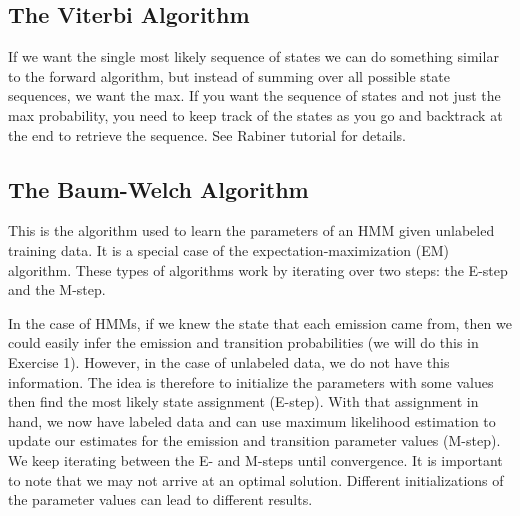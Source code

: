 \documentclass[11pt, oneside]{article}
\begin{document}
\subsection{The Viterbi Algorithm}

If we want the single most likely sequence of states we can do something similar to the forward algorithm, but instead of summing over all possible state sequences, we want the max. If you want the sequence of states and not just the max probability, you need to keep track of the states as you go and backtrack at the end to retrieve the sequence. See Rabiner tutorial for details.


\subsection{The Baum-Welch Algorithm}

This is the algorithm used to learn the parameters of an HMM given unlabeled training data. 
It is a special case of the expectation-maximization (EM) algorithm. These types of algorithms work by iterating over two steps: the E-step and the M-step.

In the case of HMMs, if we knew the state that each emission came from, then we could easily infer the emission and transition probabilities (we will do this in Exercise 1). However, in the case of unlabeled data, we do not have this information. The idea is therefore to initialize the parameters with some values then find the most likely state assignment (E-step). With that assignment in hand, we now have labeled data and can use maximum likelihood estimation to update our estimates for the emission and transition parameter values (M-step). We keep iterating between the E- and M-steps until convergence. It is important to note that we may not arrive at an optimal solution. Different initializations of the parameter values can lead to different results.
\end{document}
